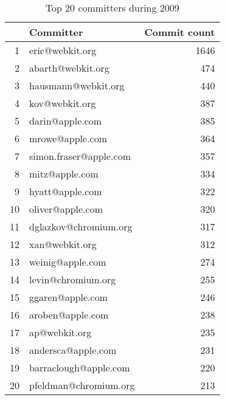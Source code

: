 \begin{table}[!htpb]
\begin{center}
\begin{tabular}{rlr}
  \hline
 & Committer & Commit count \\ 
  \hline
1 & eric@webkit.org & 1646 \\ 
  2 & abarth@webkit.org & 474 \\ 
  3 & hausmann@webkit.org & 440 \\ 
  4 & kov@webkit.org & 387 \\ 
  5 & darin@apple.com & 385 \\ 
  6 & mrowe@apple.com & 364 \\ 
  7 & simon.fraser@apple.com & 357 \\ 
  8 & mitz@apple.com & 334 \\ 
  9 & hyatt@apple.com & 322 \\ 
  10 & oliver@apple.com & 320 \\ 
  11 & dglazkov@chromium.org & 317 \\ 
  12 & xan@webkit.org & 312 \\ 
  13 & weinig@apple.com & 274 \\ 
  14 & levin@chromium.org & 255 \\ 
  15 & ggaren@apple.com & 246 \\ 
  16 & aroben@apple.com & 238 \\ 
  17 & ap@webkit.org & 235 \\ 
  18 & andersca@apple.com & 231 \\ 
  19 & barraclough@apple.com & 220 \\ 
  20 & pfeldman@chromium.org & 213 \\ 
   \hline
\end{tabular}
\caption{Top 20 committers during 2009}
\label{commits:2009top20}
\end{center}
\end{table}

